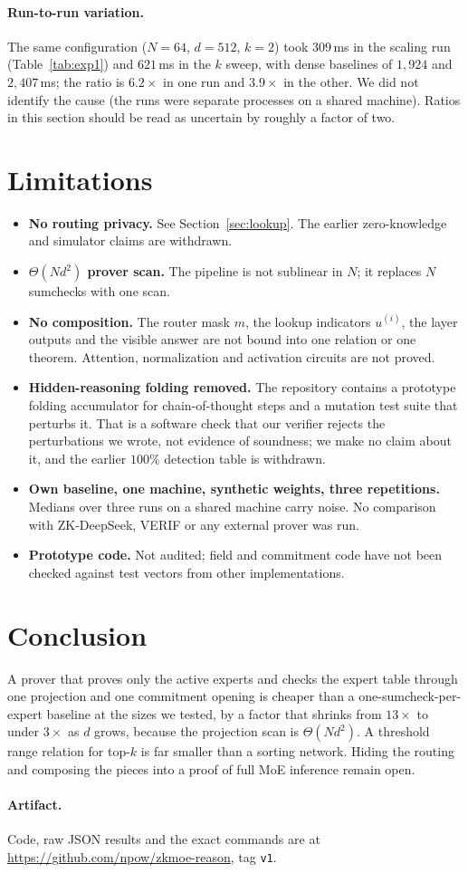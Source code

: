 \documentclass[10pt,twocolumn]{article}
\begin{document}
\paragraph{Run-to-run variation.} The same configuration ($N=64$, $d=512$, $k=2$) took $309$\,ms in the scaling run (Table~\ref{tab:exp1}) and $621$\,ms in the $k$ sweep, with dense baselines of $1{,}924$ and $2{,}407$\,ms; the ratio is $6.2\times$ in one run and $3.9\times$ in the other. We did not identify the cause (the runs were separate processes on a shared machine). Ratios in this section should be read as uncertain by roughly a factor of two.

\section{Limitations}
\label{sec:limits}
\begin{itemize}[leftmargin=*,itemsep=2pt]
    \item \textbf{No routing privacy.} See Section~\ref{sec:lookup}. The earlier zero-knowledge and simulator claims are withdrawn.
    \item \textbf{$\Theta(Nd^2)$ prover scan.} The pipeline is not sublinear in $N$; it replaces $N$ sumchecks with one scan.
    \item \textbf{No composition.} The router mask $m$, the lookup indicators $u^{(i)}$, the layer outputs and the visible answer are not bound into one relation or one theorem. Attention, normalization and activation circuits are not proved.
    \item \textbf{Hidden-reasoning folding removed.} The repository contains a prototype folding accumulator for chain-of-thought steps and a mutation test suite that perturbs it. That is a software check that our verifier rejects the perturbations we wrote, not evidence of soundness; we make no claim about it, and the earlier $100\%$ detection table is withdrawn.
    \item \textbf{Own baseline, one machine, synthetic weights, three repetitions.} Medians over three runs on a shared machine carry noise. No comparison with ZK-DeepSeek, VERIF or any external prover was run.
    \item \textbf{Prototype code.} Not audited; field and commitment code have not been checked against test vectors from other implementations.
\end{itemize}

\section{Conclusion}
A prover that proves only the active experts and checks the expert table through one projection and one commitment opening is cheaper than a one-sumcheck-per-expert baseline at the sizes we tested, by a factor that shrinks from $13\times$ to under $3\times$ as $d$ grows, because the projection scan is $\Theta(Nd^2)$. A threshold range relation for top-$k$ is far smaller than a sorting network. Hiding the routing and composing the pieces into a proof of full MoE inference remain open.

\paragraph{Artifact.} Code, raw JSON results and the exact commands are at \url{https://github.com/npow/zkmoe-reason}, tag \texttt{v1}.



\end{document}
